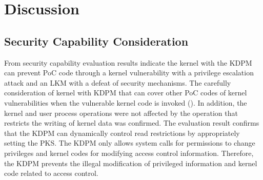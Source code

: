\section{Discussion}  \label{section:discussion}
\subsection{Security Capability Consideration}
From security capability evaluation results indicate the kernel with the KDPM
can prevent PoC code through a kernel vulnerability with a privilege escalation
attack and an LKM with a defeat of security mechanisms.
%
The carefully consideration of kernel with KDPM that can cover other PoC
codes of kernel vulnerabilities when the vulnerable kernel code is invoked
().
%
%
%
%
In addition, the kernel and user process operations were not affected by the
operation that restricts the writing of kernel data was confirmed.
%
The evaluation result confirms that the KDPM can
dynamically control read restrictions by appropriately setting the PKS.
%
The KDPM only allows system calls for permissions to change privileges
and kernel codes for modifying access control information.
%
Therefore, the KDPM prevents the illegal modification of privileged information
and kernel code related to access control.

